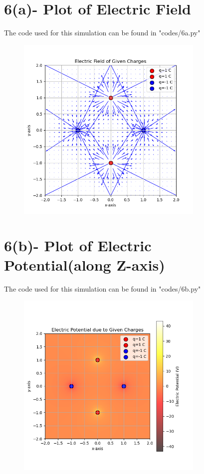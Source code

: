\documentclass{article}
\begin{document}
\section{6(a)- Plot of Electric Field}
The code used for this simulation can be found in "codes/6a.py"
\begin{figure}[H]
    \centering
    \includegraphics[width=0.8\textwidth]{figs/6a.png}
    \label{fig:Electric field}
\end{figure}

\section{6(b)- Plot of Electric Potential(along Z-axis)}
The code used for this simulation can be found in "codes/6b.py"
\begin{figure}[H]
    \centering
    \includegraphics[width=0.8\textwidth]{figs/6b.png}
    \label{fig:|F|}
\end{figure}
\end{document}
